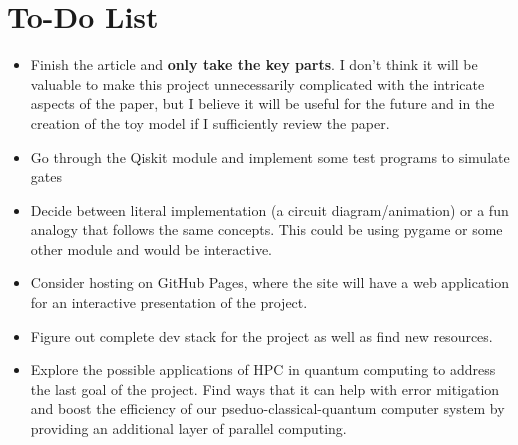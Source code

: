 \documentclass{article}
\begin{document}
\section*{To-Do List}
\begin{itemize}
    \item Finish the article and \textbf{only take the key parts}. I don't think it will be valuable to make this project unnecessarily complicated with the intricate aspects of the paper, but I believe it will be useful for the future and in the creation of the toy model if I sufficiently review the paper.
    \item Go through the Qiskit module and implement some test programs to simulate gates
    \item Decide between literal implementation (a circuit diagram/animation) or a fun analogy that follows the same concepts. This could be using pygame or some other module and would be interactive. 
    \item Consider hosting on GitHub Pages, where the site will have a web application for an interactive presentation of the project. 
    \item Figure out complete dev stack for the project as well as find new resources. 
    \item Explore the possible applications of HPC in quantum computing to address the last goal of the project. Find ways that it can help with error mitigation and boost the efficiency of our pseduo-classical-quantum computer system by providing an additional layer of parallel computing.
\end{itemize}
\end{document}
